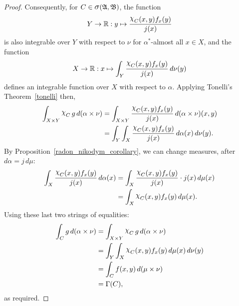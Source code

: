 \documentclass[
twoside=true,
paper=letter,
fontsize=9pt,
pagesize=auto,
leqno,
openany,
headsepline,
overfullrule,
]{scrbook}
\theoremstyle{plain}
\theoremstyle{plain}
\theoremstyle{definition}
\theoremstyle{bfnoteitalic}
\theoremstyle{bfnoteroman}
\newcommand{\sigalg}[1]{\mathfrak{#1}}
\newcommand{\sagb}{\mathop{\hbox{\large{$\sigma$}}}\nolimits}
\newcommand{\charfunction}[1]{\mathop{{\raisebox{2pt}{$\chi$}}_{#1}}}
\newcommand{\R}{\mathbb{R}}
\newcommand{\sigmaalgebra}{\sigalg{A}}
\newcommand{\sigmaalgebraii}{\sigalg{B}}
\newcommand{\productsig}[2]{\sagb(#1,#2)}
\newcommand{\funcj}{j}
\newcommand{\function}{f}
\newcommand{\functionii}{g}
\newcommand{\measurespace}{X}
\newcommand{\measurespaceii}{Y}
\newcommand{\mspaceelt}{x}
\newcommand{\mspaceeltii}{y}
\newcommand{\measure}{\mu}
\newcommand{\measureii}{\nu}
\newcommand{\setiii}{C}
\newcommand{\measonprod}{\Gamma}%
\newcommand{\marginalone}{\alpha}%
\begin{document}
\begin{proof}
Consequently, for $\setiii\in\productsig{\sigmaalgebra}{\sigmaalgebraii}$, 
the function
\[
\measurespaceii\to\R :
\mspaceeltii \mapsto
\frac{\charfunction{\setiii}(\mspaceelt,\mspaceeltii)
\function_\mspaceelt(\mspaceeltii)}
{\funcj(\mspaceelt)}
\]
is also integrable over $\measurespaceii$ with respect to $\measureii$ for 
$\marginalone^*$-almost all $\mspaceelt\in\measurespace$,
and the function
\[
\measurespace\to\R :
\mspaceelt \mapsto 
\int_\measurespaceii 
\frac{
\charfunction{\setiii}(\mspaceelt,\mspaceeltii) 
\function_\mspaceelt(\mspaceeltii)}{\funcj(\mspaceelt)} 
\, d\measureii(\mspaceeltii)
\]
defines an integrable function over $\measurespace$ with respect to 
$\marginalone$.
Applying Tonelli's Theorem~\ref{tonelli} then,
\begin{align*}
\int_{\measurespace\times\measurespaceii}
\charfunction{\setiii}
\functionii
\, d(\marginalone\times\measureii)
& =
\int_{\measurespace\times\measurespaceii}
\frac{
\charfunction{\setiii}(\mspaceelt,\mspaceeltii) 
\function_\mspaceelt(\mspaceeltii)}
{\funcj(\mspaceelt)} 
\, d(\marginalone\times\measureii)(\mspaceelt,\mspaceeltii)
\\
& =
\int_\measurespaceii
\int_\measurespace 
\frac{
\charfunction{\setiii}(\mspaceelt,\mspaceeltii) 
\function_\mspaceelt(\mspaceeltii)}{\funcj(\mspaceelt)} 
\, d\marginalone(\mspaceelt)
\, d\measureii(\mspaceeltii).
\end{align*}
By Proposition~\ref{radon_nikodym_corollary}, we can change measures, after
$d\marginalone = \funcj \, d\measure$:
\begin{align*}
\int_\measurespace 
\frac{
\charfunction{\setiii}(\mspaceelt,\mspaceeltii) 
\function_\mspaceelt(\mspaceeltii)}{\funcj(\mspaceelt)} 
\, d\marginalone(\mspaceelt)
& =
\int_\measurespace 
\frac{
\charfunction{\setiii}(\mspaceelt,\mspaceeltii) 
\function_\mspaceelt(\mspaceeltii)}{\funcj(\mspaceelt)} 
\cdot \funcj(\mspaceelt)
\, d\measure(\mspaceelt)
\\
& =
\int_\measurespace 
\charfunction{\setiii}(\mspaceelt,\mspaceeltii) 
\function_\mspaceelt(\mspaceeltii)
\, d\measure(\mspaceelt).
\end{align*}
Using these last two strings of equalities:
\begin{align*}
\int_\setiii \functionii
\,d(\marginalone\times\measureii)
& = 
\int_{\measurespace\times\measurespaceii}
\charfunction{\setiii}
\functionii
\, d(\marginalone\times\measureii)
\\
& =
\int_\measurespaceii
\int_\measurespace 
\charfunction{\setiii}(\mspaceelt,\mspaceeltii) 
\function_\mspaceelt(\mspaceeltii)
\, d\measure(\mspaceelt)
\, d\measureii(\mspaceeltii)
\\
& =
\int_{\setiii} 
\function(\mspaceelt,\mspaceeltii)
\, d(\measure\times\measureii)
\\
& =
\measonprod(\setiii),
\end{align*}
as required.


\end{proof}
\end{document}
